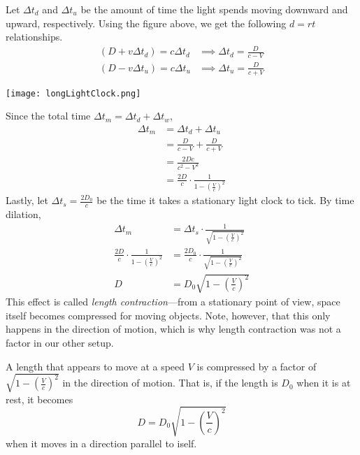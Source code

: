 \documentclass[../p023main.tex]{subfiles}
\begin{document}
Let $\Delta t_d$ and $\Delta t_u$ be the amount of time the light spends moving downward and upward, respectively.
Using the figure above, we get the following $d = rt$ relationships.
\begin{align*}
    (D + v \Delta t_d) = c \Delta t_d &\implies \Delta t_d = \frac{D}{c - V} \\
    (D - v \Delta t_u) = c \Delta t_u &\implies \Delta t_u = \frac{D}{c + V}
\end{align*}
\begin{center}
    \texttt{[image: longLightClock.png]}
\end{center}
Since the total time $\Delta t_m = \Delta t_d + \Delta t_w$,
\begin{align*}
    \Delta t_m &= \Delta t_d + \Delta t_u \\
    &= \frac{D}{c - V} + \frac{D}{c + V} \\
    &= \frac{2Dc}{c^2 - V^2} \\
    &= \frac{2D}{c} \cdot \frac{1}{1 - \left( \frac{V}{c} \right)^2}
\end{align*}
Lastly, let $\Delta t_s = \frac{2D_0}{c}$ be the time it takes a stationary light clock to tick.
By time dilation,
\begin{align*}
    \Delta t_m &= \Delta t_s \cdot \frac{1}{\sqrt{1 - \left( \frac{V}{c} \right)^2}} \\
    \frac{2D}{c} \cdot \frac{1}{1 - \left( \frac{V}{c} \right)^2} &= \frac{2D_0}{c} \cdot \frac{1}{\sqrt{1 - \left( \frac{V}{c} \right)^2}} \\
    D &= D_0 \sqrt{1 - \left( \frac{V}{c} \right)^2}
\end{align*}
This effect is called \textit{length contraction}---from a stationary point of view, space itself becomes compressed for moving objects.
Note, however, that this only happens in the direction of motion, which is why length contraction was not a factor in our other setup.

\begin{summary}
    A length that appears to move at a speed $V$ is compressed by a factor of $\sqrt{1 - \left( \frac{V}{c} \right)^2}$ in the direction of motion.
    That is, if the length is $D_0$ when it is at rest, it becomes
    \[ D = D_0 \sqrt{1 - \left( \frac{V}{c} \right)^2} \]
    when it moves in a direction parallel to iself.
\end{summary}
\pagebreak
\end{document}
